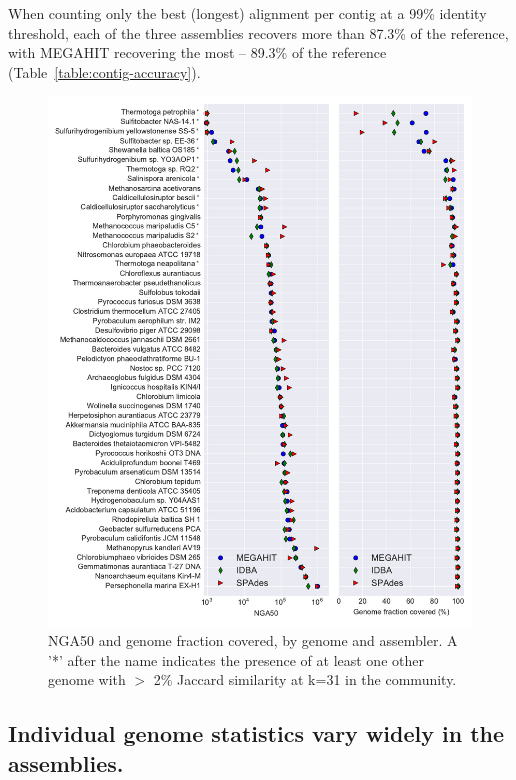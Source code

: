 \documentclass[11pt]{article}
\begin{document}
When counting only the best (longest) alignment per contig at a 99\%
identity threshold, each of the three assemblies recovers more than 87.3\% of the
reference, with MEGAHIT recovering the most -- 89.3\% of the reference
(Table~\ref{table:contig-accuracy}).


\newpage

\begin{figure}[!h]

  
\centering
\includegraphics[width=\textwidth]{combined.pdf}  
\caption{NGA50 and genome fraction covered, by genome and assembler. A '*' after the name indicates the presence of at least one other genome with $>$ 2\% Jaccard similarity at k=31 in the community.}
\label{fig:nga50}
\end{figure}

\newpage

\subsection*{Individual genome statistics vary widely in the assemblies.}
\end{document}
